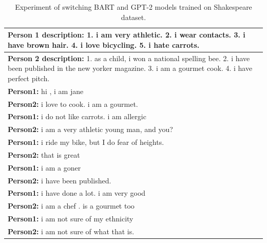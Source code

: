 \begin{table}[ht]
\centering
 \begin{tabular}{|p{14cm}|} 
 \hline\hline
 \textbf{Person 1 description:} 1. i am very athletic. 2. i wear contacts. 3. i have brown hair. 4. i love bicycling. 5. i hate carrots. \\
 \hline
 \textbf{Person 2 description:} 1. as a child, i won a national spelling bee. 2. i have been published in the new yorker magazine. 3. i am a gourmet cook. 4. i have perfect pitch. \\
 \hline\hline
 \textbf{Person1:} hi , i am jane  \\
 \textbf{Person2:} i love to cook. i am a gourmet. \\ 
 \textbf{Person1:} i do not like carrots. i am allergic \\
 \textbf{Person2:} i am a very athletic young man, and you?\\
 \textbf{Person1:} i ride my bike, but I do fear of heights. \\
 \textbf{Person2:} that is great \\
 \textbf{Person1:} i am a goner  \\
 \textbf{Person2:} i have been published.\\
 \textbf{Person1:} i have done a lot. i am very good  \\
 \textbf{Person2:} i am a chef . is a gourmet too \\
 \textbf{Person1:} i am not sure of my ethnicity \\
 \textbf{Person2:} i am not sure of what that is. \\
 \hline\hline
 \end{tabular}
 \caption{Experiment of switching BART and GPT-2 models trained on Shakespeare dataset.}
\label{tab:shakespeare_switch}
\end{table}

